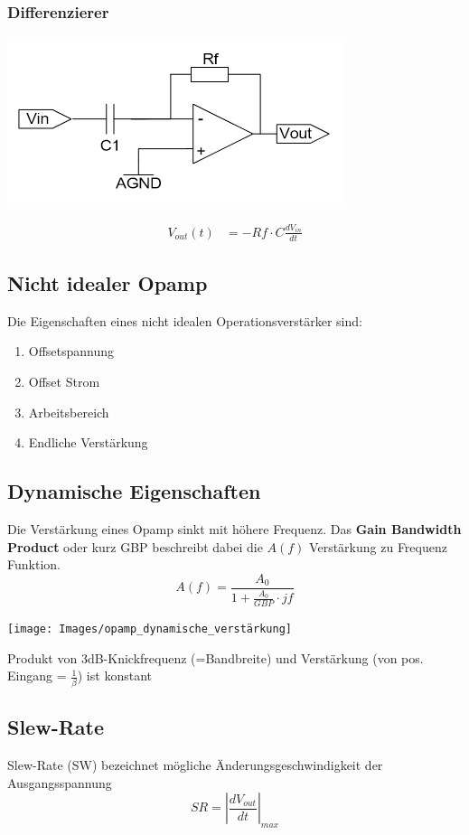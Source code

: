 \subsubsection{Differenzierer}
\begin{minipage}{0.20\textwidth}
	\includegraphics[width=\linewidth,keepaspectratio=true]{./Images/differenzierer}
\end{minipage}%
\begin{minipage}{0.30\textwidth}
	\begin{align*}
		V_{out}(t) &= -Rf\cdot C \frac{dV_{in}}{dt}
	\end{align*}
\end{minipage}


\subsection{Nicht idealer Opamp}
Die Eigenschaften eines nicht idealen Operationsverstärker sind:
\begin{enumerate}[nosep]
	\item Offsetspannung	
	\item Offset Strom
	\item Arbeitsbereich
	\item Endliche Verstärkung	
\end{enumerate}

\subsection{Dynamische Eigenschaften}
Die Verstärkung eines Opamp sinkt mit höhere Frequenz. Das \textbf{Gain Bandwidth Product} oder kurz GBP beschreibt dabei die $A(f)$ Verstärkung zu Frequenz Funktion.
\[
A(f) = \frac{A_0}{1 + \frac{A_0}{GBP}\cdot jf}
\]
\begin{center}
	\texttt{[image: Images/opamp\_dynamische\_verstärkung]}
\end{center}

Produkt von 3dB-Knickfrequenz (=Bandbreite) und Verstärkung (von pos. Eingang = $\frac{1}{\beta}$) ist konstant

\subsection{Slew-Rate}
Slew-Rate (SW) bezeichnet mögliche Änderungsgeschwindigkeit der Ausgangsspannung
\[
SR = \left|\frac{dV_{out}}{dt}\right|_{max}
\]
